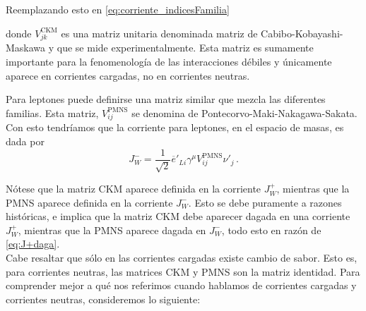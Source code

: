 Reemplazando esto en \eqref{eq:corriente_indicesFamilia}
%

\noindent donde $V_{jk}^{\text{CKM}}$ es una matriz unitaria denominada matriz de Cabibo-Kobayashi-Maskawa y que se mide experimentalmente. Esta matriz es sumamente importante para la fenomenología de las interacciones débiles y únicamente aparece en corrientes cargadas, no en corrientes neutras.

Para leptones puede definirse una matriz similar que mezcla las diferentes familias. Esta matriz, $V_{ij}^{\text{PMNS}}$ se denomina de Pontecorvo-Maki-Nakagawa-Sakata. Con esto tendríamos que la corriente para leptones, en el espacio de masas, es dada por
%
\begin{equation}
	J^-_W = \frac{1}{\sqrt{2}} \overline{e}'_{L i} \gamma^\mu V_{ij}^{\text{PMNS}} \nu'_j \,.
\end{equation}

Nótese que la matriz CKM aparece definida en la corriente $J^+_W$, mientras que la PMNS aparece definida en la corriente $J^-_W$. Esto se debe puramente a razones históricas, e implica que la matriz CKM debe aparecer dagada en una corriente $J^+_W$, mientras que la PMNS aparece dagada en $J^-_W$, todo esto en razón de \eqref{eq:J+daga}. \\

Cabe resaltar que sólo en las corrientes cargadas existe cambio de sabor. Esto es, para corrientes neutras, las matrices CKM y PMNS son la matriz identidad. Para comprender mejor a qué nos referimos cuando hablamos de corrientes cargadas y corrientes neutras, consideremos lo siguiente:

